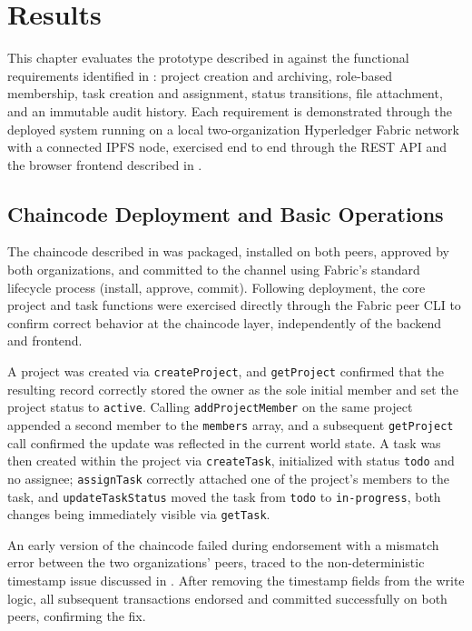 \chapter{Results}
\label{ch:results}

This chapter evaluates the prototype described in  against the functional requirements identified in : project creation and archiving, role-based membership, task creation and assignment, status transitions, file attachment, and an immutable audit history. Each requirement is demonstrated through the deployed system running on a local two-organization Hyperledger Fabric network with a connected IPFS node, exercised end to end through the REST API and the browser frontend described in .

\section{Chaincode Deployment and Basic Operations}
\label{sec:results-chaincode}

The chaincode described in  was packaged, installed on both peers, approved by both organizations, and committed to the channel using Fabric's standard lifecycle process (install, approve, commit). Following deployment, the core project and task functions were exercised directly through the Fabric peer CLI to confirm correct behavior at the chaincode layer, independently of the backend and frontend.

A project was created via \texttt{createProject}, and \texttt{getProject} confirmed that the resulting record correctly stored the owner as the sole initial member and set the project status to \texttt{active}. Calling \texttt{addProjectMember} on the same project appended a second member to the \texttt{members} array, and a subsequent \texttt{getProject} call confirmed the update was reflected in the current world state. A task was then created within the project via \texttt{createTask}, initialized with status \texttt{todo} and no assignee; \texttt{assignTask} correctly attached one of the project's members to the task, and \texttt{updateTaskStatus} moved the task from \texttt{todo} to \texttt{in-progress}, both changes being immediately visible via \texttt{getTask}.

An early version of the chaincode failed during endorsement with a mismatch error between the two organizations' peers, traced to the non-deterministic timestamp issue discussed in . After removing the timestamp fields from the write logic, all subsequent transactions endorsed and committed successfully on both peers, confirming the fix.

